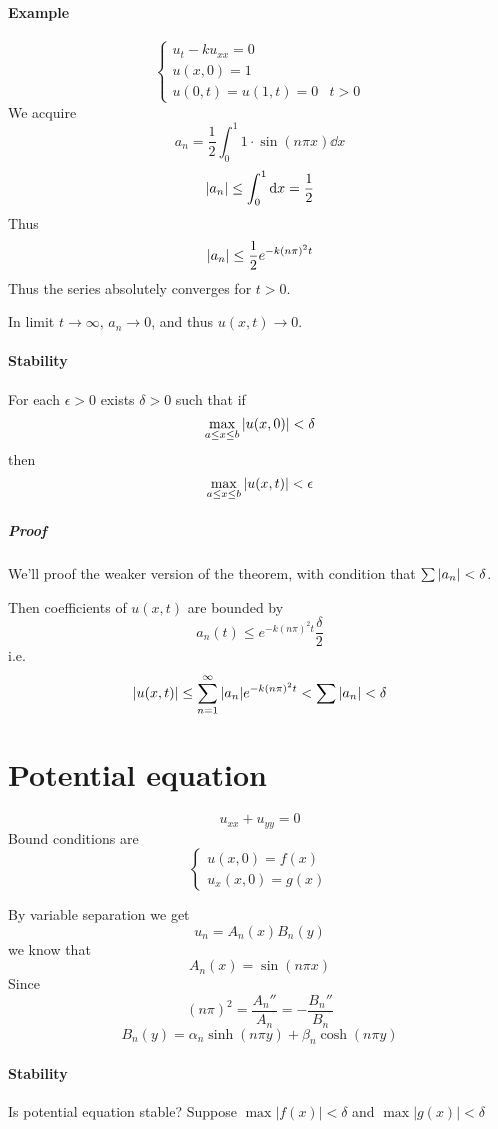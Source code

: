 \paragraph{Example}
$$
\begin{cases}
u_t-ku_{xx} = 0 \\
u(x,0)  = 1\\
u(0,t) = u(1,t) = 0 & t>0
\end{cases}
$$
We acquire
$$a_n = \frac{1}{2} \int_0^1 1 \cdot \sin(n\pi x) \dd{x}$$
$$\abs{a_n} \leq \int_0^1 \dd{x} = \frac{1}{2} $$
Thus
$$\abs{a_n} \leq \frac{1}{2}e^{-k(n\pi)^2 t}$$
Thus the series absolutely converges for $t>0$.

In limit $t\to \infty $, $a_n \to 0$, and thus $u(x,t) \to 0$.

\paragraph{Stability}
For each $\epsilon>0$ exists $\delta > 0$ such that if
$$\max\limits_{a\leq x\leq b} \abs{u(x,0)} < \delta$$ %
then
$$\max\limits_{a\leq x\leq b} \abs{u(x,t)} < \epsilon$$
\subparagraph{Proof}
We'll proof the weaker version of the theorem, with condition that $\sum \abs{a_n} < \delta$.

Then coefficients of $u(x,t)$ are bounded by
$$a_n(t) \leq e^{-k(n\pi)^2 t}\frac{\delta}{2}$$
i.e.
$$\abs{u(x,t)} \leq \sum_{n=1}^\infty \abs{a_n} e^{-k(n\pi)^2 t} < \sum |a_n| <\delta$$
\section{Potential equation} 
$$u_{xx} + u_{yy} = 0$$
Bound conditions are
$$\begin{cases}
u(x,0) = f(x)\\
u_x(x,0) = g(x)
\end{cases}$$

By variable separation we get
$$u_n =A_n(x)B_n(y)$$
we know that
$$A_n(x) = \sin(n\pi x) $$
Since
$$(n\pi)^2 = \frac{A_n''}{A_n} = -\frac{B_n''}{B_n}$$
$$B_n(y) = \alpha_n \sinh (n\pi y) + \beta_n \cosh(n \pi y)$$

\paragraph{Stability}
Is potential equation stable? Suppose $\max |f(x)| < \delta$ and $\max |g(x)| < \delta$

